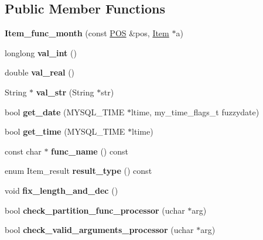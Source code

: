 \subsection*{Public Member Functions}
\begin{DoxyCompactItemize}
\item 
\mbox{\label{classItem__func__month_ab471a37782e4606ba2e894602f883c59}} 
{\bfseries Item\+\_\+func\+\_\+month} (const \mbox{\hyperlink{structYYLTYPE}{P\+OS}} \&pos, \mbox{\hyperlink{classItem}{Item}} $\ast$a)
\item 
\mbox{\label{classItem__func__month_a1cd7ca8116248221623d8eab64b5adf5}} 
longlong {\bfseries val\+\_\+int} ()
\item 
\mbox{\label{classItem__func__month_a3a947d7f444a9313be2a71f114191d4f}} 
double {\bfseries val\+\_\+real} ()
\item 
\mbox{\label{classItem__func__month_a4c1126a16a646d2ad5f10d705631e60c}} 
String $\ast$ {\bfseries val\+\_\+str} (String $\ast$str)
\item 
\mbox{\label{classItem__func__month_aa210ad74f0feb10eefe2ad466be3e7a2}} 
bool {\bfseries get\+\_\+date} (M\+Y\+S\+Q\+L\+\_\+\+T\+I\+ME $\ast$ltime, my\+\_\+time\+\_\+flags\+\_\+t fuzzydate)
\item 
\mbox{\label{classItem__func__month_a6a86f144bfde38691f5d6e52db6ed288}} 
bool {\bfseries get\+\_\+time} (M\+Y\+S\+Q\+L\+\_\+\+T\+I\+ME $\ast$ltime)
\item 
\mbox{\label{classItem__func__month_a7423e3a1d765614e5919f5c653aca75c}} 
const char $\ast$ {\bfseries func\+\_\+name} () const
\item 
\mbox{\label{classItem__func__month_a8530cb30cde2201e0d578f6fa4902afe}} 
enum Item\+\_\+result {\bfseries result\+\_\+type} () const
\item 
\mbox{\label{classItem__func__month_a8974061c001257f5ce65390f4983c46e}} 
void {\bfseries fix\+\_\+length\+\_\+and\+\_\+dec} ()
\item 
\mbox{\label{classItem__func__month_a54158f6bc34716d55680e56b7ddb7c7b}} 
bool {\bfseries check\+\_\+partition\+\_\+func\+\_\+processor} (uchar $\ast$arg)
\item 
\mbox{\label{classItem__func__month_a2a3877e5c0ad85c303f5ff5bd80c5d2b}} 
bool {\bfseries check\+\_\+valid\+\_\+arguments\+\_\+processor} (uchar $\ast$arg)
\end{DoxyCompactItemize}
